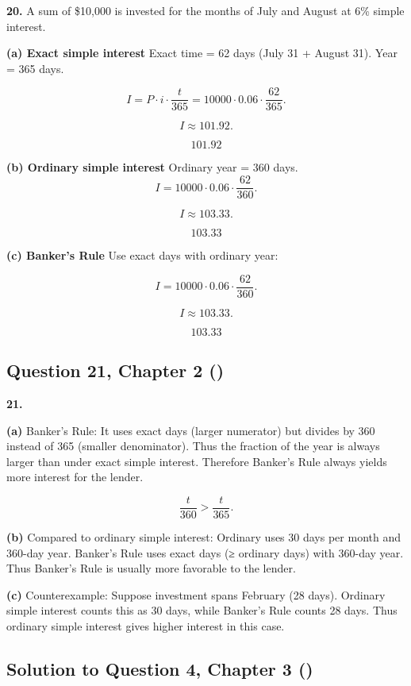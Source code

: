 \documentclass[12pt, a4paper]{article}
\begin{document}
\textbf{20.} A sum of \$10{,}000 is invested for the months of July and August at 6\% simple interest.  

\bigskip
\textbf{(a) Exact simple interest}  
Exact time = 62 days (July 31 + August 31).  
Year = 365 days.  

\[
I = P \cdot i \cdot \frac{t}{365}
= 10000 \cdot 0.06 \cdot \frac{62}{365}.
\]

\[
I \approx 101.92.
\]

\[
\boxed{101.92}
\]

\bigskip
\textbf{(b) Ordinary simple interest}  
Ordinary year = 360 days.  
\[
I = 10000 \cdot 0.06 \cdot \frac{62}{360}.
\]

\[
I \approx 103.33.
\]

\[
\boxed{103.33}
\]

\bigskip
\textbf{(c) Banker's Rule}  
Use exact days with ordinary year:  

\[
I = 10000 \cdot 0.06 \cdot \frac{62}{360}.
\]

\[
I \approx 103.33.
\]

\[
\boxed{103.33}
\]


\subsection*{Question 21, Chapter 2 (\cite{toi3rd})}

\textbf{21.}  

\bigskip
\textbf{(a)} Banker's Rule:  
It uses exact days (larger numerator) but divides by 360 instead of 365 (smaller denominator).  
Thus the fraction of the year is always larger than under exact simple interest.  
Therefore Banker's Rule always yields more interest for the lender.  

\[
\frac{t}{360} > \frac{t}{365}.
\]

\bigskip
\textbf{(b)} Compared to ordinary simple interest:  
Ordinary uses 30 days per month and 360-day year.  
Banker's Rule uses exact days (≥ ordinary days) with 360-day year.  
Thus Banker's Rule is usually more favorable to the lender.  

\bigskip
\textbf{(c)} Counterexample:  
Suppose investment spans February (28 days).  
Ordinary simple interest counts this as 30 days,  
while Banker's Rule counts 28 days.  
Thus ordinary simple interest gives higher interest in this case.  

\subsection*{Solution to Question 4, Chapter 3 (\cite{toi3rd})}
\end{document}
